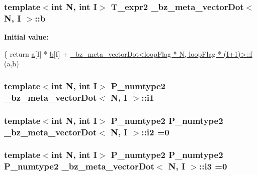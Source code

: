 \subsubsection[{b}]{\setlength{\rightskip}{0pt plus 5cm}template$<$int N, int I$>$ T\+\_\+expr2 {\bf \+\_\+bz\+\_\+meta\+\_\+vector\+Dot}$<$ {\bf N}, I $>$\+::b}\label{class__bz__meta__vectorDot_ad1903677045a497386f8ca43d2e34566}
{\bfseries Initial value\+:}
\begin{DoxyCode}
\{
        \textcolor{keywordflow}{return} \hyperlink{namespacewebbrowser_a8fd4131959171403366d96e7f1bf9a59}{a}[I] * \hyperlink{class__bz__meta__vectorDot_ad7f93a12572bd4ece39058b28b9fb05e}{b}[I]
            + \hyperlink{class__bz__meta__vectorDot}{\_bz\_meta\_vectorDot<loopFlag * N, loopFlag * (I+1)>::f}
      (\hyperlink{namespacewebbrowser_a8fd4131959171403366d96e7f1bf9a59}{a},\hyperlink{class__bz__meta__vectorDot_ad7f93a12572bd4ece39058b28b9fb05e}{b})
\end{DoxyCode}
\hypertarget{class__bz__meta__vectorDot_ae5402e68a79a4888a534da85279c0fd1}{}
\subsubsection[{i1}]{\setlength{\rightskip}{0pt plus 5cm}template$<$int N, int I$>$ P\+\_\+numtype2 {\bf \+\_\+bz\+\_\+meta\+\_\+vector\+Dot}$<$ {\bf N}, I $>$\+::i1}\label{class__bz__meta__vectorDot_ae5402e68a79a4888a534da85279c0fd1}
\hypertarget{class__bz__meta__vectorDot_a8a94d994b688356ea47b02fb4ab902de}{}
\subsubsection[{i2}]{\setlength{\rightskip}{0pt plus 5cm}template$<$int N, int I$>$ P\+\_\+numtype2 P\+\_\+numtype2 {\bf \+\_\+bz\+\_\+meta\+\_\+vector\+Dot}$<$ {\bf N}, I $>$\+::i2 =0}\label{class__bz__meta__vectorDot_a8a94d994b688356ea47b02fb4ab902de}
\hypertarget{class__bz__meta__vectorDot_a9a543b54777d6bd1dfb5234e7a257349}{}
\subsubsection[{i3}]{\setlength{\rightskip}{0pt plus 5cm}template$<$int N, int I$>$ P\+\_\+numtype2 P\+\_\+numtype2 P\+\_\+numtype2 {\bf \+\_\+bz\+\_\+meta\+\_\+vector\+Dot}$<$ {\bf N}, I $>$\+::i3 =0}\label{class__bz__meta__vectorDot_a9a543b54777d6bd1dfb5234e7a257349}
\hypertarget{class__bz__meta__vectorDot_a0640208203def938760605ff450daab7}{}
